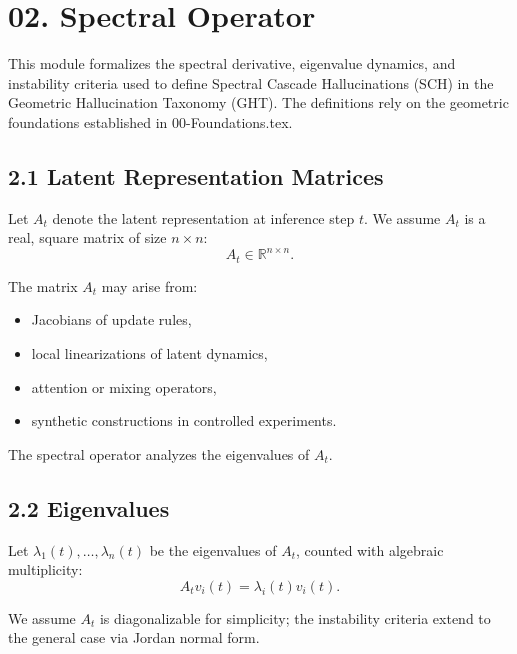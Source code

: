 
\section*{02. Spectral Operator}

This module formalizes the spectral derivative, eigenvalue dynamics, and
instability criteria used to define Spectral Cascade Hallucinations (SCH)
in the Geometric Hallucination Taxonomy (GHT). The definitions rely on
the geometric foundations established in 00-Foundations.tex.

\subsection*{2.1 Latent Representation Matrices}

Let $A_t$ denote the latent representation at inference step $t$. We
assume $A_t$ is a real, square matrix of size $n \times n$:
\[
A_t \in \mathbb{R}^{n \times n}.
\]

The matrix $A_t$ may arise from:
\begin{itemize}
\item Jacobians of update rules,
\item local linearizations of latent dynamics,
\item attention or mixing operators,
\item synthetic constructions in controlled experiments.
\end{itemize}

The spectral operator analyzes the eigenvalues of $A_t$.

\subsection*{2.2 Eigenvalues}

Let $\lambda_1(t), \dots, \lambda_n(t)$ be the eigenvalues of $A_t$,
counted with algebraic multiplicity:
\[
A_t v_i(t) = \lambda_i(t) v_i(t).
\]

We assume $A_t$ is diagonalizable for simplicity; the instability
criteria extend to the general case via Jordan normal form.

